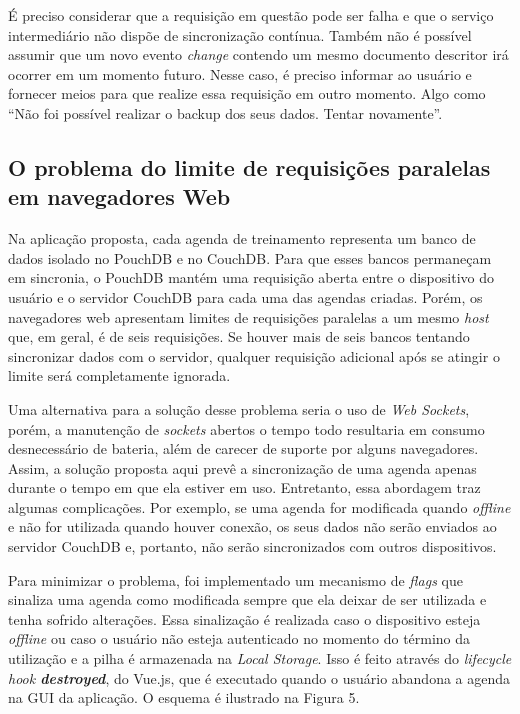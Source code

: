 \documentclass[
	article,			%
	11pt,				%
	oneside,			%
	a4paper,			%
	english,			%
	brazil,				%
	sumario=tradicional
	]{abntex2}
\begin{document}
É preciso considerar que a requisição em questão pode ser falha e que o serviço intermediário não dispõe de sincronização contínua. Também não é possível assumir que um novo evento \textit{change} contendo um mesmo documento descritor irá ocorrer em um momento futuro. Nesse caso, é preciso informar ao usuário e fornecer meios para que realize essa requisição em outro momento. Algo como “Não foi possível realizar o backup dos seus dados. Tentar novamente”.

\subsection{O problema do limite de requisições paralelas em navegadores Web}

Na aplicação proposta, cada agenda de treinamento representa um banco de dados isolado no PouchDB e no CouchDB. Para que esses bancos permaneçam em sincronia, o PouchDB mantém uma requisição aberta entre o dispositivo do usuário e o servidor CouchDB para cada uma das agendas criadas. Porém, os navegadores web apresentam limites de requisições paralelas a um mesmo \textit{host} que, em geral, é de seis requisições. Se houver mais de seis bancos tentando sincronizar dados com o servidor, qualquer requisição adicional após se atingir o limite será completamente ignorada.

Uma alternativa para a solução desse problema seria o uso de \textit{Web Sockets}, porém, a manutenção de \textit{sockets} abertos o tempo todo resultaria em consumo desnecessário de bateria, além de carecer de suporte por alguns navegadores. Assim, a solução proposta aqui prevê a sincronização de uma agenda apenas durante o tempo em que ela estiver em uso. Entretanto, essa abordagem traz algumas complicações. Por exemplo, se uma agenda for modificada quando \textit{offline} e não for utilizada quando houver conexão, os seus dados não serão enviados ao servidor CouchDB e, portanto, não serão sincronizados com outros dispositivos.

Para minimizar o problema, foi implementado um mecanismo de \textit{flags} que sinaliza uma agenda como modificada sempre que ela deixar de ser utilizada e tenha sofrido alterações. Essa sinalização é realizada caso o dispositivo esteja \textit{offline} ou caso o usuário não esteja autenticado no momento do término da utilização e a pilha é armazenada na \textit{Local Storage}. Isso é feito através do \textit{lifecycle hook \textbf{destroyed}}, do Vue.js, que é executado quando o usuário abandona a agenda na GUI da aplicação. O esquema é ilustrado na Figura 5.
\end{document}
